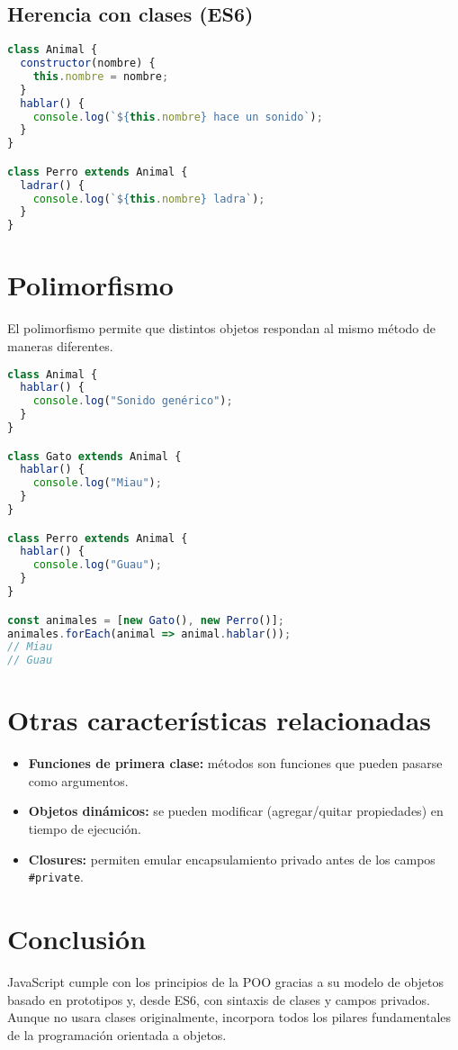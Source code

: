 \documentclass[12pt]{article}
\begin{document}
\subsection*{Herencia con clases (ES6)}

\begin{lstlisting}[language=JavaScript]
class Animal {
  constructor(nombre) {
    this.nombre = nombre;
  }
  hablar() {
    console.log(`${this.nombre} hace un sonido`);
  }
}

class Perro extends Animal {
  ladrar() {
    console.log(`${this.nombre} ladra`);
  }
}
\end{lstlisting}

\section{Polimorfismo}

El polimorfismo permite que distintos objetos respondan al mismo método de maneras diferentes.

\begin{lstlisting}[language=JavaScript]
class Animal {
  hablar() {
    console.log("Sonido genérico");
  }
}

class Gato extends Animal {
  hablar() {
    console.log("Miau");
  }
}

class Perro extends Animal {
  hablar() {
    console.log("Guau");
  }
}

const animales = [new Gato(), new Perro()];
animales.forEach(animal => animal.hablar());
// Miau
// Guau
\end{lstlisting}

\section*{Otras características relacionadas}

\begin{itemize}
  \item \textbf{Funciones de primera clase:} métodos son funciones que pueden pasarse como argumentos.
  \item \textbf{Objetos dinámicos:} se pueden modificar (agregar/quitar propiedades) en tiempo de ejecución.
  \item \textbf{Closures:} permiten emular encapsulamiento privado antes de los campos \texttt{\#private}.
\end{itemize}

\section*{Conclusión}

JavaScript cumple con los principios de la POO gracias a su modelo de objetos basado en prototipos y, desde ES6, con sintaxis de clases y campos privados. Aunque no usara clases originalmente, incorpora todos los pilares fundamentales de la programación orientada a objetos.
\end{document}
